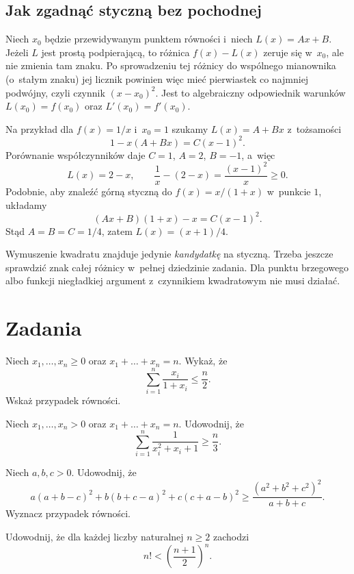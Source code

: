 \documentclass{lecture-kuznia}
\begin{document}
\subsection{Jak zgadnąć styczną bez pochodnej}

Niech $x_0$ będzie przewidywanym punktem równości i~niech
$L(x)=Ax+B$. Jeżeli $L$ jest prostą podpierającą, to różnica
$f(x)-L(x)$ zeruje się w~$x_0$, ale nie zmienia tam znaku. Po
sprowadzeniu tej różnicy do wspólnego mianownika (o~stałym znaku)
jej licznik powinien więc mieć pierwiastek co najmniej podwójny, czyli
czynnik $(x-x_0)^2$. Jest to algebraiczny odpowiednik warunków
$L(x_0)=f(x_0)$ oraz $L'(x_0)=f'(x_0)$.

Na przykład dla $f(x)=1/x$ i~$x_0=1$ szukamy $L(x)=A+Bx$ z~tożsamości
\[
	1-x(A+Bx)=C(x-1)^2.
\]
Porównanie współczynników daje $C=1$, $A=2$, $B=-1$, a~więc
\[
	L(x)=2-x,\qquad
	\frac1x-(2-x)=\frac{(x-1)^2}{x}\geqslant0.
\]
Podobnie, aby znaleźć górną styczną do $f(x)=x/(1+x)$ w~punkcie $1$,
układamy
\[
	(Ax+B)(1+x)-x=C(x-1)^2.
\]
Stąd $A=B=C=1/4$, zatem $L(x)=(x+1)/4$.

Wymuszenie kwadratu znajduje jedynie \emph{kandydatkę} na styczną.
Trzeba jeszcze sprawdzić znak całej różnicy w~pełnej dziedzinie zadania.
Dla punktu brzegowego albo funkcji niegładkiej argument z~czynnikiem
kwadratowym nie musi działać.

\newpage
\section{Zadania}

\begin{problem}\label{Z1}
	Niech $x_1,\dots,x_n\geqslant0$ oraz $x_1+\dots+x_n=n$. Wykaż, że
	\[
		\sum_{i=1}^n\frac{x_i}{1+x_i}\leqslant\frac n2.
	\]
	Wskaż przypadek równości.
\end{problem}

\begin{problem}\label{Z2}
	Niech $x_1,\dots,x_n>0$ oraz $x_1+\dots+x_n=n$. Udowodnij, że
	\[
		\sum_{i=1}^n\frac1{x_i^2+x_i+1}\geqslant\frac n3.
	\]
\end{problem}

\begin{problem}\label{ZKwadratWazony}
	Niech $a,b,c>0$. Udowodnij, że
	\[
		a(a+b-c)^2+b(b+c-a)^2+c(c+a-b)^2
		\geqslant\frac{(a^2+b^2+c^2)^2}{a+b+c}.
	\]
	Wyznacz przypadek równości.
\end{problem}

\begin{problem}\label{Z6}
	Udowodnij, że dla każdej liczby naturalnej $n\geqslant2$ zachodzi
	\[
		n!<\left(\frac{n+1}{2}\right)^n.
	\]
\end{problem}
\end{document}
